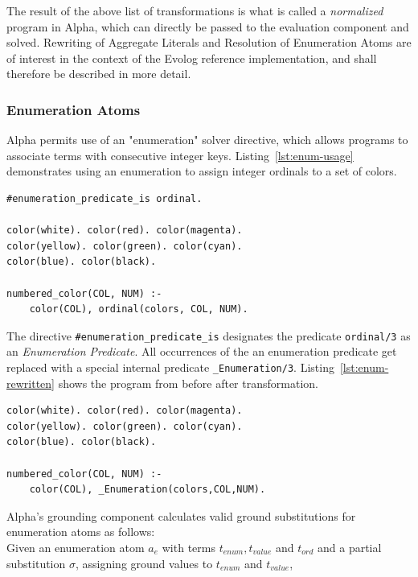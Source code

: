 The result of the above list of transformations is what is called a \emph{normalized} program in Alpha, which can directly be passed to the evaluation component and solved. Rewriting of Aggregate Literals and Resolution of Enumeration Atoms are of interest in the context of the Evolog reference implementation, and shall therefore be described in more detail.

\subsubsection{Enumeration Atoms}
\label{subsubsec:alpha-arch-enum-resolution}
Alpha permits use of an "enumeration" solver directive, which allows programs to associate terms with consecutive integer keys.
Listing~\ref{lst:enum-usage} demonstrates using an enumeration to assign integer ordinals to a set of colors. 
\begin{lstlisting}[style=asp-code, label={lst:enum-usage}, caption={Using the Enumeration Directive to enumerate color symbols.}]
#enumeration_predicate_is ordinal.

color(white). color(red). color(magenta).
color(yellow). color(green). color(cyan).
color(blue). color(black).
    
numbered_color(COL, NUM) :- 
    color(COL), ordinal(colors, COL, NUM).    
\end{lstlisting}    
The directive \texttt{\#enumeration\_predicate\_is} designates the predicate \texttt{ordinal/3} as an \emph{Enumeration Predicate}. All occurrences of the an enumeration predicate get replaced with a special internal predicate \texttt{\_Enumeration/3}. Listing~\ref{lst:enum-rewritten} shows the program from before after transformation.
\begin{lstlisting}[style=asp-code, label={lst:enum-rewritten}, caption={Transformed color numbering.}]
color(white). color(red). color(magenta).
color(yellow). color(green). color(cyan).
color(blue). color(black).

numbered_color(COL, NUM) :- 
    color(COL), _Enumeration(colors,COL,NUM).
\end{lstlisting} 
Alpha's grounding component calculates valid ground substitutions for enumeration atoms as follows: \\
Given an enumeration atom $a_e$ with terms $t_{enum}, t_{value}$ and $t_{ord}$ and a partial substitution $\sigma$, assigning ground values to $t_{enum}$ and $t_{value}$,
